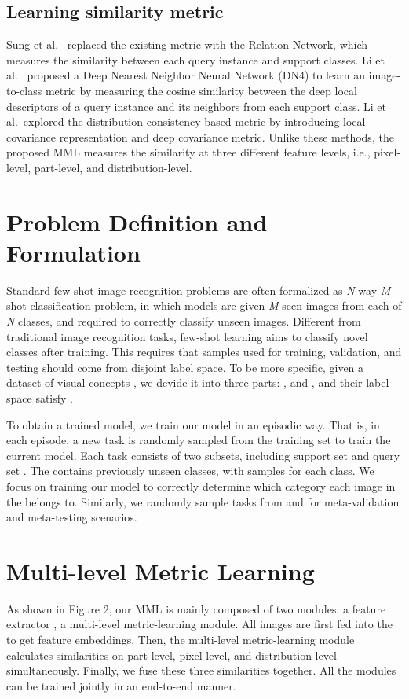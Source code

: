 \documentclass{article}
\begin{document}
\subsection{Learning similarity metric}
Sung et al.~\cite{sung2018learning} replaced the existing metric with the Relation Network, which measures the similarity between each query instance and support classes. Li et al.~\cite{li2019revisiting} proposed a Deep Nearest Neighbor Neural Network (DN4) to learn an image-to-class metric by measuring the cosine similarity between the deep local descriptors of a query instance and its neighbors from each support class. Li et al.~\cite{li2019distribution}explored the distribution consistency-based metric by introducing local covariance representation and deep covariance metric. Unlike these methods, the proposed MML measures the similarity at three different feature levels, i.e., pixel-level, part-level, and distribution-level.

\section{Problem Definition and Formulation}
Standard few-shot image recognition problems are often formalized as \emph{N}-way \emph{M}-shot classification problem, in which models are given \emph{M} seen images from each of \emph{N} classes, and required to correctly classify unseen images. 
Different from traditional image recognition tasks, few-shot learning aims to classify novel classes after training. This requires
that samples used for training, validation, and testing should
come from disjoint label space.
To be more specific, given a dataset of visual concepts , we devide it into three parts: ,  and , and their label space satisfy .

To obtain a trained model, we train our model in an episodic way. That is, in each episode, a new task is randomly sampled from the training set  to train the current model. Each task consists of two subsets, including support set  and query set . The  contains  previously unseen classes, with  samples for each class. We focus on training our model to correctly determine which category each image in the  belongs to. Similarly, we randomly sample tasks from  and  for meta-validation and meta-testing scenarios.

\section{Multi-level Metric Learning}
As shown in Figure 2, our MML is mainly composed of two modules: a feature extractor , a multi-level metric-learning module. All images are first fed into the  to get feature embeddings. Then, the multi-level metric-learning module calculates similarities on part-level, pixel-level, and distribution-level simultaneously. Finally, we fuse these three similarities together. All the modules can be trained jointly in an end-to-end manner.
\end{document}
